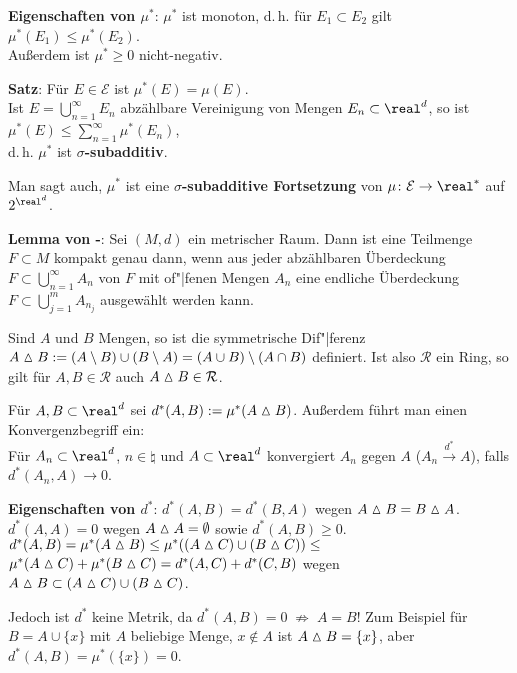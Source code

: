 \textbf{Eigenschaften von $\mu^\ast$}:
$\mu^\ast$ ist monoton, d.\,h. für $E_1 \subset E_2$ gilt
$\mu^\ast(E_1) \le \mu^\ast(E_2)$. \\
Außerdem ist $\mu^\ast \ge 0$ nicht-negativ.

\textbf{Satz}:
Für $E \in \mathcal{E}$ ist $\mu^\ast(E) = \mu(E)$. \\
Ist $E = \bigcup_{n=1}^\infty E_n$ abzählbare Vereinigung von Mengen
$E_n \subset \real^d$, so ist
$\mu^\ast(E) \le \sum_{n=1}^\infty \mu^\ast(E_n)$, \\
d.\,h. $\mu^\ast$ ist \textbf{$\sigma$-subadditiv}.

Man sagt auch, $\mu^\ast$ ist eine
\textbf{$\sigma$-subadditive Fortsetzung} von
$\mu\colon \mathcal{E} \rightarrow \real^\ast$ auf $2^{\real^d}$.

\textbf{Lemma von -}:
Sei $(M, d)$ ein metrischer Raum.
Dann ist eine Teilmenge $F \subset M$ kompakt genau dann, wenn aus jeder
abzählbaren Überdeckung $F \subset \bigcup_{n=1}^\infty A_n$ von $F$
mit of"|fenen Mengen $A_n$ eine endliche Überdeckung
$F \subset \bigcup_{j=1}^m A_{n_j}$ ausgewählt werden kann.

\linie
\pagebreak

Sind $A$ und $B$ Mengen, so ist die symmetrische Dif"|ferenz
$A \vartriangle B := (A \setminus B) \cup (B \setminus A) =
(A \cup B) \setminus (A \cap B)$ definiert.
Ist also $\mathcal{R}$ ein Ring, so gilt für $A, B \in \mathcal{R}$ auch
$A \vartriangle B \in \mathcal{R}$.

Für $A, B \subset \real^d$ sei $d^\ast(A, B) := \mu^\ast(A \vartriangle B)$.
Außerdem führt man einen Konvergenzbegriff ein: \\
Für $A_n \subset \real^d$, $n \in \natural$ und $A \subset \real^d$ konvergiert
$A_n$ gegen $A$ ($A_n \xrightarrow{d^\ast} A$), falls $d^\ast(A_n, A) \to 0$.

\textbf{Eigenschaften von $d^\ast$}:
$d^\ast(A, B) = d^\ast(B, A)$ wegen $A \vartriangle B = B \vartriangle A$. \\
$d^\ast(A, A) = 0$ wegen $A \vartriangle A = \emptyset$ sowie
$d^\ast(A, B) \ge 0$. \\
$d^\ast(A, B) = \mu^\ast(A \vartriangle B) \le
\mu^\ast((A \vartriangle C) \cup (B \vartriangle C)) \le$ \\
$\mu^\ast(A \vartriangle C) + \mu^\ast(B \vartriangle C) =
d^\ast(A, C) + d^\ast(C, B)$
wegen $A \vartriangle B \subset (A \vartriangle C) \cup (B \vartriangle C)$.

Jedoch ist $d^\ast$ keine Metrik, da
$d^\ast(A, B) = 0 \;\not\Rightarrow\; A = B$! \qquad
Zum Beispiel für $B = A \cup \{x\}$ mit $A$ beliebige Menge, $x \notin A$ ist
$A \vartriangle B = \{x\}$, aber $d^\ast(A, B) = \mu^\ast(\{x\}) = 0$.

